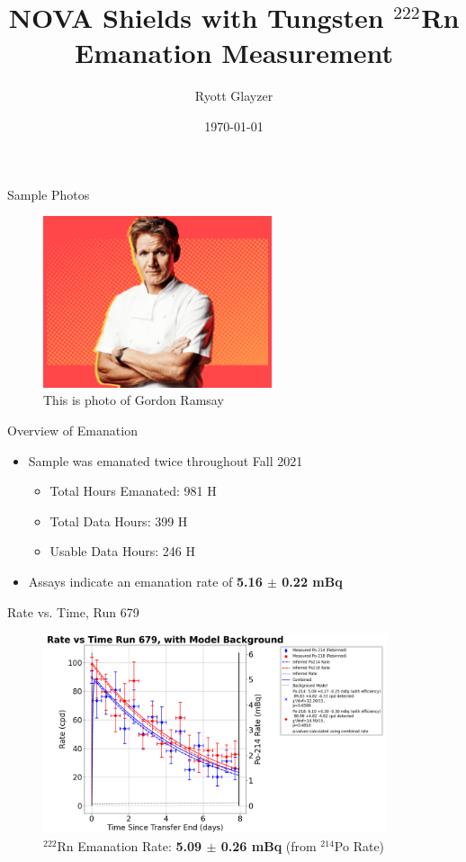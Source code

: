 \documentclass{beamer}
\title{NOVA Shields with Tungsten $^{222}$Rn Emanation Measurement}
\author[R. Glayzer]{Ryott Glayzer}
\institute[SDSMT]
{
    Lab Assistant\\
    SD Mines
}
\date[2023]{\today}
\begin{document}
\frame{\titlepage}

\begin{frame}{Sample Photos}
    \begin{figure}
        \centering
        \includegraphics[width=0.6\textwidth]{gordon-ramsay.png}
        \caption{This is photo of Gordon Ramsay}
    \end{figure}
\end{frame}

\begin{frame}{Overview of Emanation}
    \begin{itemize}
        \item Sample was emanated twice throughout Fall 2021
        \begin{itemize}
            \item Total Hours Emanated: 981 H 
            \item Total Data Hours: 399 H
            \item Usable Data Hours: 246 H 
        \end{itemize}
        \item Assays indicate an emanation rate of 
        \textbf{5.16 $\pm$ 0.22 mBq}
        
    \end{itemize}
    
\end{frame}
\begin{frame}{Rate vs. Time, Run 679}
    \begin{figure}
        \begin{center}
            \includegraphics[width=0.9\textwidth]
            {Rate_vs_Time_Run_679,_with_Model_Background.png}
            \caption{$^{222}$Rn Emanation Rate: 
            \textbf{5.09 $\pm$ 0.26 mBq} (from $^{214}$Po Rate)}
        \end{center}
    \end{figure}  
\end{frame}
\end{document}
